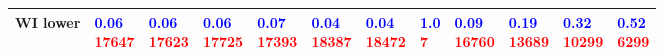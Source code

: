 \begin{tabular}{llllllllllll}
WI lower    &  \makecell{\textcolor{blue}{0.06} \\ \textcolor{red}{17647}} &  \makecell{\textcolor{blue}{0.06} \\ \textcolor{red}{17623}} &  \makecell{\textcolor{blue}{0.06} \\ \textcolor{red}{17725}} &  \makecell{\textcolor{blue}{0.07} \\ \textcolor{red}{17393}} &  \makecell{\textcolor{blue}{0.04} \\ \textcolor{red}{18387}} &  \makecell{\textcolor{blue}{0.04} \\ \textcolor{red}{18472}} &     \makecell{\textcolor{blue}{1.0} \\ \textcolor{red}{7}} &  \makecell{\textcolor{blue}{0.09} \\ \textcolor{red}{16760}} &  \makecell{\textcolor{blue}{0.19} \\ \textcolor{red}{13689}} &  \makecell{\textcolor{blue}{0.32} \\ \textcolor{red}{10299}} &   \makecell{\textcolor{blue}{0.52} \\ \textcolor{red}{6299}} \\
\bottomrule
\end{tabular}
